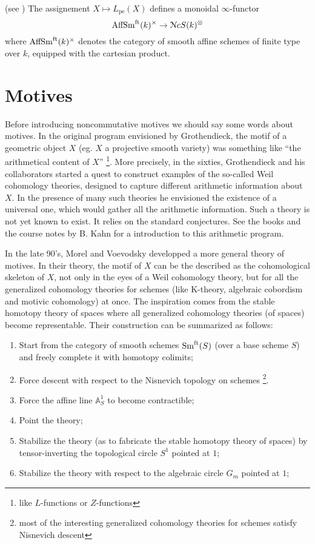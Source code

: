 \begin{refsection}
\begin{prop}(see \cite[6.38]{nc1})
The assignement $X\mapsto L_\mathrm{pe}(X)$ defines a monoidal $\infty$-functor 
$$\mathrm{AffSm}^{\mathrm{ft}}(k)^{\times}\to \mathcal{N}cS(k)^{\otimes}$$
\noindent where $\mathrm{AffSm}^{\mathrm{ft}}(k)^{\times}$ denotes the category of smooth affine schemes of finite type over $k$, equipped with the cartesian product.
\end{prop}

\section{Motives}

Before introducing noncommutative motives we should say some words about motives. In the original program envisioned by Grothendieck, the motif of a geometric object $X$ (eg. $X$ a projective smooth variety) was something like ``the arithmetical content of $X$'' \footnote{like $L$-functions or $Z$-functions}. More precisely, in the sixties, Grothendieck and his collaborators started a quest to construct examples of the so-called Weil cohomology theories, designed to capture different arithmetic information about $X$. In the presence of many such theories he envisioned the existence of a universal one, which would gather all the arithmetic information. Such a theory is not yet known to exist. It relies on the standard conjectures. See the books \cite{MR2115000, motivesSeattle} and the course notes by B. Kahn \cite{kahnzetamotives} for a introduction to this arithmetic program.

In the late 90's, Morel and Voevodsky \cite{voevodsky-morel} developped a more general theory of motives. In their theory, the motif of $X$ can be the described as the cohomological skeleton of $X$, not only in the eyes of a Weil cohomology theory, but for all the generalized cohomology theories for schemes (like K-theory, algebraic cobordism and motivic cohomology) at once. The inspiration comes from the stable homotopy theory of spaces where all generalized cohomology theories (of spaces) become representable. Their construction can be summarized as follows:

\begin{enumerate}
\item Start from the category of smooth schemes $\mathrm{Sm}^\mathrm{ft}(S)$ (over a base scheme $S$) and freely complete it with homotopy colimits;
\item Force descent with respect to the Nisnevich topology on schemes \footnote{most of the interesting generalized cohomology theories for schemes satisfy Nisnevich descent}.
\item Force the affine line $\mathbb{A}^1_S$ to become contractible;
\item Point the theory;
\item Stabilize the theory (as to fabricate the stable homotopy theory of spaces) by tensor-inverting the topological circle $S^1$ pointed at $1$;
\item Stabilize the theory with respect to the algebraic circle $G_m$ pointed at $1$;  
\end{enumerate}


\end{refsection}
